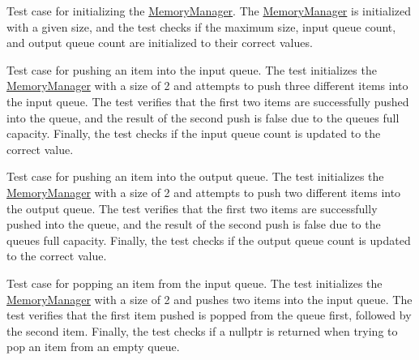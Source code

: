 
\begin{DoxyRefList}
\item[Member \mbox{\hyperlink{memory__manager_8test_8cc_a869f8d44bd06d29b1285fbc3611b966f}{TEST}} (Memory\+Manager\+Test, Initial)]\label{test__test000001}%
%
Test case for initializing the \mbox{\hyperlink{classMemoryManager}{Memory\+Manager}}. The \mbox{\hyperlink{classMemoryManager}{Memory\+Manager}} is initialized with a given size, and the test checks if the maximum size, input queue count, and output queue count are initialized to their correct values.  
\item[Member \mbox{\hyperlink{memory__manager_8test_8cc_a25d0c0534f912bb6607daf8677285310}{TEST}} (Memory\+Manager\+Test, Push\+Into\+In)]\label{test__test000002}%
%
Test case for pushing an item into the input queue. The test initializes the \mbox{\hyperlink{classMemoryManager}{Memory\+Manager}} with a size of 2 and attempts to push three different items into the input queue. The test verifies that the first two items are successfully pushed into the queue, and the result of the second push is false due to the queue\textquotesingle{}s full capacity. Finally, the test checks if the input queue count is updated to the correct value.  
\item[Member \mbox{\hyperlink{memory__manager_8test_8cc_aa4d93c94a4ad6503f1eb36bdea15cbd8}{TEST}} (Memory\+Manager\+Test, Push\+Into\+Out)]\label{test__test000003}%
%
Test case for pushing an item into the output queue. The test initializes the \mbox{\hyperlink{classMemoryManager}{Memory\+Manager}} with a size of 2 and attempts to push two different items into the output queue. The test verifies that the first two items are successfully pushed into the queue, and the result of the second push is false due to the queue\textquotesingle{}s full capacity. Finally, the test checks if the output queue count is updated to the correct value.  
\item[Member \mbox{\hyperlink{memory__manager_8test_8cc_a0c4ba9c85a884661b43550d7973bf254}{TEST}} (Memory\+Manager\+Test, Pop\+From\+In)]\label{test__test000004}%
%
Test case for popping an item from the input queue. The test initializes the \mbox{\hyperlink{classMemoryManager}{Memory\+Manager}} with a size of 2 and pushes two items into the input queue. The test verifies that the first item pushed is popped from the queue first, followed by the second item. Finally, the test checks if a nullptr is returned when trying to pop an item from an empty queue.  

\end{DoxyRefList}

